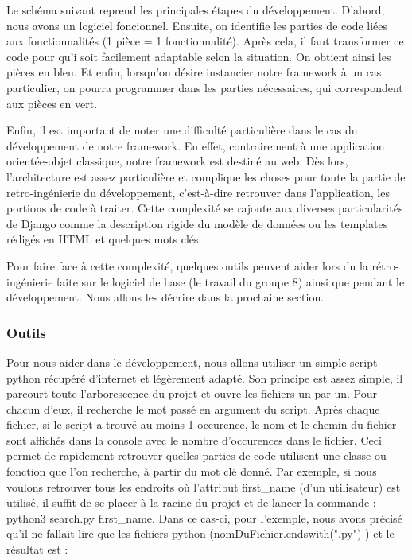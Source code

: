 Le schéma suivant reprend les principales étapes du développement.  D'abord,  nous avons un logiciel foncionnel.  Ensuite,  on identifie les parties de code liées aux fonctionnalités (1 pièce = 1 fonctionnalité).  Après cela,  il faut transformer ce code pour qu'i soit facilement adaptable selon la situation.  On obtient ainsi les pièces en bleu.  Et enfin,  lorsqu'on désire instancier notre framework à un cas particulier,  on pourra programmer dans les parties nécessaires,  qui correspondent aux pièces en vert.

\begin{center}
\end{center}

Enfin,  il est important de noter une difficulté particulière dans le cas du développement de notre framework.  En effet,  contrairement à une application orientée-objet classique,  notre framework est destiné au web.  Dès lors,  l'architecture est assez particulière et complique les choses pour toute la partie de retro-ingénierie du développement,  c'est-à-dire retrouver dans l'application,  les portions de code à traiter.  Cette complexité se rajoute aux diverses particularités de Django comme la description rigide du modèle de données ou les templates rédigés en HTML et quelques mots clés.

Pour faire face à cette complexité,  quelques outils peuvent aider lors du la rétro-ingénierie faite sur le logiciel de base (le travail du groupe 8) ainsi que pendant le développement.  Nous allons les décrire dans la prochaine section.

\subsubsection{Outils}

Pour nous aider dans le développement,  nous allons utiliser un simple script python récupéré d'internet et légèrement adapté.  Son principe est assez simple,  il parcourt toute l'arborescence du projet et ouvre les fichiers un par un.  Pour chacun d'eux,  il recherche le mot passé en argument du script.  Après chaque fichier,  si le script a trouvé au moins 1 occurence,  le nom et le chemin du fichier sont affichés dans la console avec le nombre d'occurences dans le fichier.  Ceci permet de rapidement retrouver quelles parties de code utilisent une classe ou fonction que l'on recherche,  à partir du mot clé donné.  Par exemple,  si nous voulons retrouver tous les endroits où l'attribut first\_name (d'un utilisateur) est utilisé,  il suffit de se placer à la racine du projet et de lancer la commande : python3 search.py first\_name.  Dans ce cas-ci,  pour l'exemple,  nous avons précisé qu'il ne fallait lire que les fichiers python (nomDuFichier.endswith(".py") ) et le résultat est : 

